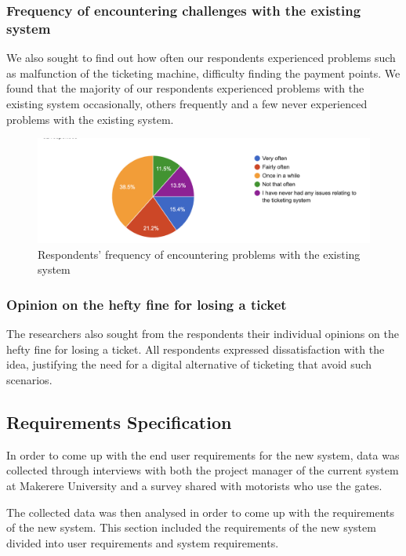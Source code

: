 \subsubsection{Frequency of encountering challenges with the existing system}
We also sought to find out how often our respondents experienced problems such as malfunction of the ticketing machine, difficulty finding the payment points. We found that the majority of our respondents experienced problems with the existing system occasionally, others frequently and a few never experienced problems with the existing system.

\begin{figure}[h]
    \begin{center}
        \hspace{-3cm}
        \includegraphics[scale = 0.6]{images/prob-freq}
        \caption{Respondents' frequency of encountering problems with the existing system}
    \end{center}
\end{figure}

\subsubsection{Opinion on the hefty fine for losing a ticket}
The researchers also sought from the respondents their individual opinions on the hefty fine for losing a ticket. All respondents expressed dissatisfaction with the idea, justifying the need for a digital alternative of ticketing that avoid such scenarios.

\clearpage

\subsection{Requirements Specification}
In order to come up with the end user requirements for the new system, data was collected through interviews with both the project manager of the current system at Makerere University and a survey shared with motorists who use the gates.

The collected data was then analysed in order to come up with the requirements of the new system. This section included the requirements of the new system divided into user requirements and system requirements.

